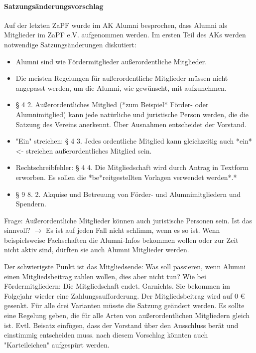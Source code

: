     \paragraph{Satzungsänderungsvorschlag}
      Auf der letzten ZaPF wurde im AK Alumni besprochen, dass Alumni als Mitglieder im ZaPF e.V. aufgenommen werden. Im ersten Teil des AKs werden notwendige Satzungsänderungen diskutiert:
      \begin{itemize}
        \item Alumni sind wie Fördermitglieder außerordentliche Mitglieder.
        \item Die meisten Regelungen für außerordentliche Mitglieder müssen nicht angepasst werden, um die Alumni, wie gewünscht, mit aufzunehmen.
        \item § 4 2. Außerordentliches Mitglied (*zum Beispiel* Förder- oder Alumnimitglied) kann jede natürliche und juristische Person werden, die die Satzung des Vereins anerkennt. Über Ausnahmen entscheidet der Vorstand.
        \item "Ein" streichen: § 4 3. Jedes ordentliche Mitglied kann gleichzeitig auch *ein* <- streichen außerordentliches Mitglied sein.
        \item Rechtschreibfehler: § 4 4. Die Mitgliedschaft wird durch Antrag in Textform erworben. Es sollen die *be*reitgestellten Vorlagen verwendet werden*.*
        \item § 9 8. 2. Akquise und Betreuung von Förder- und Alumnimitgliedern und Spendern.
      \end{itemize}
      Frage: Außerordentliche Mitglieder können auch juristische Personen sein. Ist das sinnvoll? $\rightarrow$ Es ist auf jeden Fall nicht schlimm, wenn es so ist. Wenn beispielsweise Fachschaften die Alumni-Infos bekommen wollen oder zur Zeit nicht aktiv sind, dürften sie auch Alumni Mitglieder werden.
      \begin{outline}
        \1 Der schwierigste Punkt ist das Mitgliedsende:
        \2 Was soll passieren, wenn Alumni einen Mitgliedsbeitrag zahlen wollen, dies aber nicht tun?
        \3 Wie bei Fördermitgliedern: Die Mitgliedschaft endet.
        \3 Garnichts. Sie bekommen im Folgejahr wieder eine Zahlungsaufforderung.
        \3 Der Mitgliedsbeitrag wird auf 0 € gesenkt.
        \2 Für alle drei Varianten müsste die Satzung geändert werden.
        \2 Es sollte eine Regelung geben, die für alle Arten von außerordentlichen Mitgliedern gleich ist. Evtl. Beisatz einfügen, dass der Vorstand über den Ausschluss berät und einstimmig entscheiden muss. nach diesem Vorschlag könnten auch "Karteileichen" aufgespürt werden.
      \end{outline}
